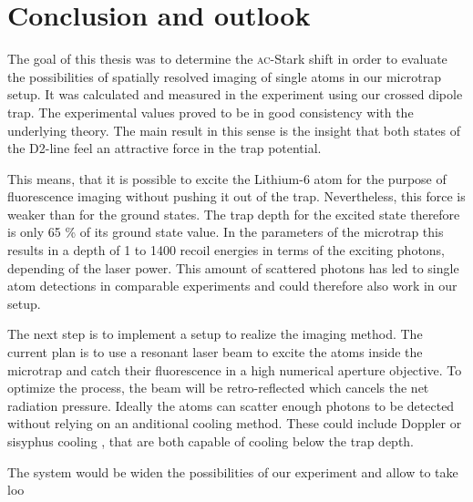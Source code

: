 \chapter{Conclusion and outlook}

The goal of this thesis was to determine the \textsc{ac}-Stark shift in order to evaluate the possibilities of spatially resolved imaging of single atoms in our microtrap setup. It was calculated and measured in the experiment using our crossed dipole trap. The experimental values proved to be in good consistency with the underlying theory. The main result in this sense is the insight that both states of the D2-line feel an attractive force in the trap potential. 

This means, that it is possible to excite the Lithium-6 atom for the purpose of fluorescence imaging without pushing it out of the trap. Nevertheless, this force is weaker than for the ground states. The trap depth for the excited state therefore is only 65 \% of its ground state value. In the parameters of the microtrap this results in a depth of 1 to 1400 recoil energies in terms of the exciting photons, depending of the laser power. This amount of scattered photons has led to single atom detections in comparable experiments \cite{schmiedmayer} and could therefore also work in our setup.

The next step is to implement a setup to realize the imaging method. The current plan is to use a resonant laser beam to excite the atoms inside the microtrap and catch their fluorescence in a high numerical aperture objective. To optimize the process, the beam will be retro-reflected which cancels the net radiation pressure. Ideally the atoms can scatter enough photons to be detected without relying on an anditional cooling method. These could include Doppler or sisyphus cooling \cite{andersen,sisyphus}, that are both capable of cooling below the trap depth.

The system would be widen the possibilities of our experiment and allow to take loo


%
